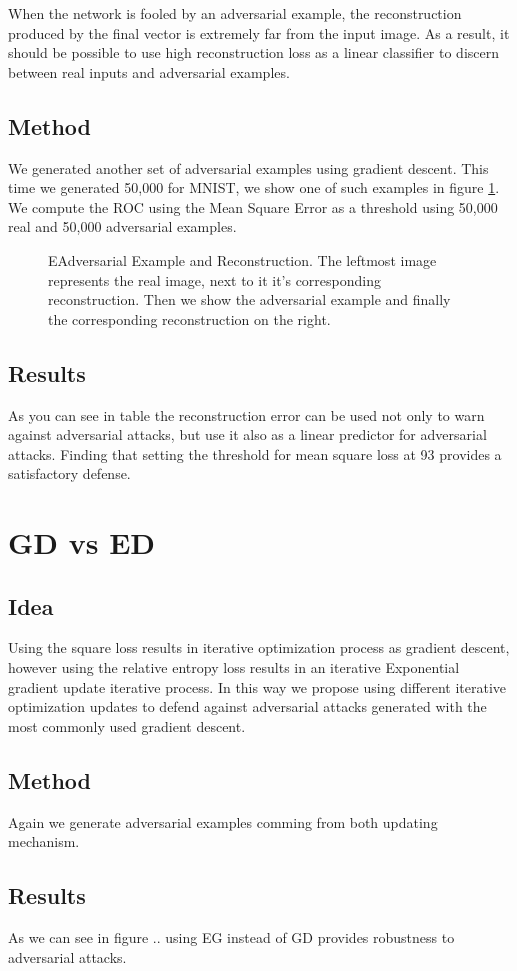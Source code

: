 \documentclass{asaproc}
\begin{document}
When the network is fooled by an adversarial example, the reconstruction produced by the final vector is extremely far from the input image. As a result, it should be possible to use high reconstruction loss as a linear classifier to discern between real inputs and adversarial examples.

\subsection*{Method}

We generated another set of adversarial examples using gradient descent. This time we generated 50,000 for MNIST, we show one of such examples in figure \ref{fig3}. We compute the ROC using the Mean Square Error as a threshold using 50,000 real and 50,000 adversarial examples.

\begin{figure}[h!]
	\centering
	\caption{\enspace EAdversarial Example and Reconstruction. The leftmost image represents the real image, next to it it's corresponding reconstruction. Then we show the adversarial example and finally the corresponding reconstruction on the right.}
	\label{fig3}
\end{figure}

\subsection*{Results}

As you can see in table the reconstruction error can be used not only to warn against adversarial attacks, but use it also as a linear predictor for adversarial attacks. Finding that setting the threshold for mean square loss at 93 provides a satisfactory defense.

\section*{GD vs ED}

\subsection*{Idea}

Using the square loss results in iterative optimization process as gradient descent, however using the relative entropy loss results in an iterative Exponential gradient update iterative process. In this way we propose using different iterative optimization updates to defend against adversarial attacks generated with the most commonly used gradient descent.

\subsection*{Method}

Again we generate adversarial examples comming from both updating mechanism. 

\subsection*{Results}

As we can see in figure .. using EG instead of GD provides robustness to adversarial attacks.






\end{document}
